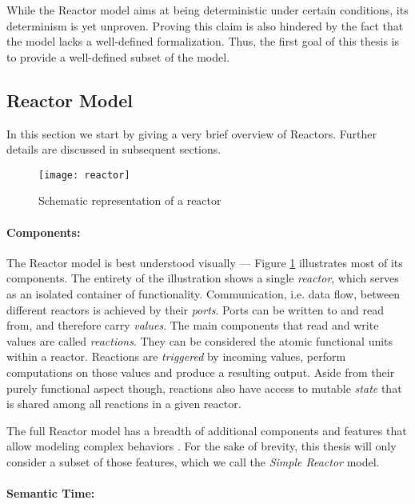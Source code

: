 While the Reactor model aims at being deterministic under certain conditions, its determinism is yet unproven.
Proving this claim is also hindered by the fact that the model lacks a well-defined formalization.
Thus, the first goal of this thesis is to provide a well-defined subset of the model.

\break

\subsection{Reactor Model}

In this section we start by giving a very brief overview of Reactors.
Further details are discussed in subsequent sections.

\begin{figure}[h]
\centering
\texttt{[image: reactor]}
\caption{Schematic representation of a reactor \cite{cyphy}}
\label{fig:reactor}
\end{figure}

\paragraph{Components:}

The Reactor model is best understood visually --- Figure \ref{fig:reactor} illustrates most of its components. 
The entirety of the illustration shows a single \emph{reactor}, which serves as an isolated container of functionality. 
Communication, i.e. data flow, between different reactors is achieved by their \emph{ports}. 
Ports can be written to and read from, and therefore carry \emph{values}.
The main components that read and write values are called \emph{reactions}. 
They can be considered the atomic functional units within a reactor. 
Reactions are \emph{triggered} by incoming values, perform computations on those values and produce a resulting output. 
Aside from their purely functional aspect though, reactions also have access to mutable \emph{state} that is shared among all reactions in a given reactor.

The full Reactor model has a breadth of additional components and features that allow modeling complex behaviors \cite[pp.~18-40]{marten}.
For the sake of brevity, this thesis will only consider a subset of those features, which we call the \emph{Simple Reactor} model.

\paragraph{Semantic Time:}

